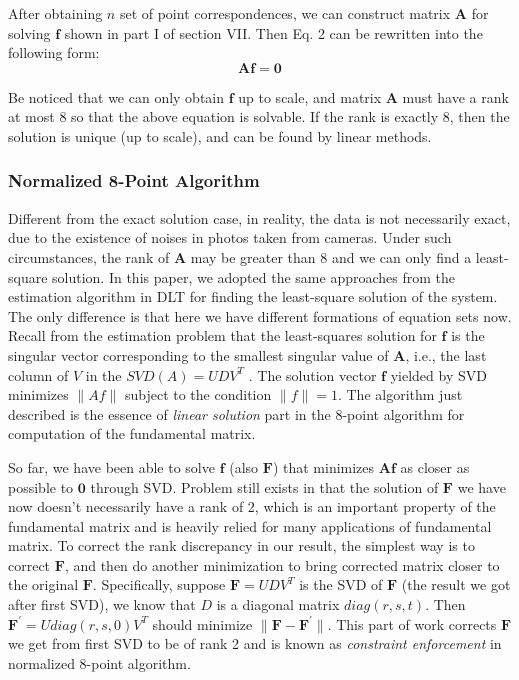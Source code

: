 \documentclass[conference]{IEEEtran}
\newcommand{\mat}[1]{\mathbf{#1}} %
\begin{document}
After obtaining $n$ set of point correspondences, we can construct matrix $\mat{A}$ for solving $\mat{f}$ shown in part I of section VII. Then Eq. 2 can be rewritten into the following form:
\begin{equation}
	\mat{A}\mat{f} = \mat{0}
\end{equation}

Be noticed that we can only obtain $\mat{f}$ up to scale, and matrix $\mat{A}$ must have a rank at most 8 so that the above equation is solvable. If the rank is exactly 8, then
the solution is unique (up to scale), and can be found by linear methods. 

\subsubsection{Normalized 8-Point Algorithm}
Different from the exact solution case, in reality, the data is not necessarily exact, due to the existence of noises in photos taken from cameras. Under such circumstances, the rank of $\mat{A}$ may be greater than 8 and we can only find a least-square solution. In this paper, we adopted the same approaches from the estimation algorithm in DLT for finding the least-square solution of the system. The only difference is that here we have different formations of equation sets now. Recall from the estimation problem that the least-squares solution for $\mat{f}$ is the singular vector corresponding to the smallest singular value of $\mat{A}$, i.e., the last column of $V$ in the $SVD(A) = UDV^T$ . The solution vector $\mat{f}$ yielded by SVD minimizes $\|Af\|$ subject to the condition $\|f\| = 1$. The algorithm just described is the essence of \emph{linear solution} part in the 8-point algorithm for computation of
the fundamental matrix.

So far, we have been able to solve $\mat{f}$ (also $\mat{F}$) that minimizes $\mat{A}\mat{f}$ as closer as possible to $\mat{0}$ through SVD. Problem still exists in that the solution of $\mat{F}$ we have now doesn't necessarily have a rank of 2, which is an important property of the fundamental matrix and is heavily relied for many applications of fundamental matrix. To correct the rank discrepancy in our result, the simplest way is to correct $\mat{F}$, and then do another minimization to bring corrected matrix closer to the original $\mat{F}$. Specifically, suppose $\mat{F} = UDV^T$ is the SVD of $\mat{F}$ (the result we got after first SVD), we know that $D$ is a diagonal matrix $diag(r, s, t)$. Then $\mat{F}^\prime = U diag(r,s,0)V^T$ should minimize $\|\mat{F} - \mat{F}^\prime\|$. This part of work corrects $\mat{F}$ we get from first SVD to be of rank 2 and is known as \emph{constraint enforcement} in normalized 8-point algorithm.
\end{document}
